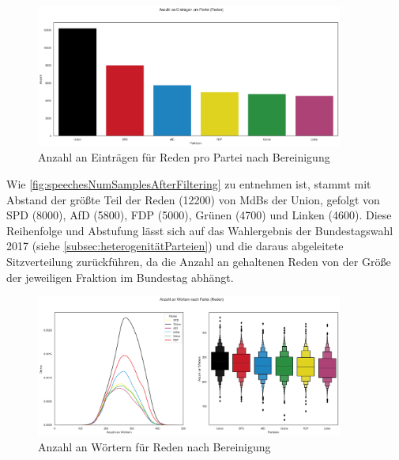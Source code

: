 \begin{figure}[H]
    \centering
    \includegraphics[width=0.9\textwidth]{data/images/speeches/speeches_num_samples_after_filter.png}
    \caption{Anzahl an Einträgen für Reden pro Partei nach Bereinigung} \label{fig:speechesNumSamplesAfterFiltering}
\end{figure}

Wie \autoref{fig:speechesNumSamplesAfterFiltering} zu entnehmen ist, stammt mit Abstand der größte Teil der Reden (\num{12200}) von \acp{MdB} der Union, gefolgt von \ac{SPD} (\num{8000}), \ac{AfD} (\num{5800}), \ac{FDP} (\num{5000}), Grünen (\num{4700}) und Linken (\num{4600}). Diese Reihenfolge und Abstufung lässt sich auf das Wahlergebnis der Bundestagswahl \num{2017} (siehe \autoref{subsec:heterogenitätParteien}) und die daraus abgeleitete Sitzverteilung zurückführen, da die Anzahl an gehaltenen Reden von der Größe der jeweiligen Fraktion im Bundestag abhängt.

\begin{figure}[H]
    \centering
    \includegraphics[width=0.9\textwidth]{data/images/speeches/speeches_word_count_after_filter.png}
    \caption{Anzahl an Wörtern für Reden nach Bereinigung} \label{fig:speechesWortCountAfterFiltering}
\end{figure}

